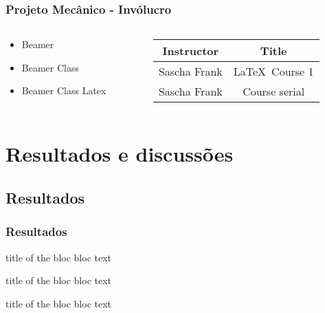 \documentclass[hyperref={pdfpagelabels=false}]{beamer}
\begin{document}
                \begin{frame}\frametitle{Projeto Mecânico - Invólucro}
                    \begin{columns}

                        \begin{column}{5cm}
                            \begin{itemize}
                                \item Beamer
                                \item Beamer Class
                                \item Beamer Class Latex
                            \end{itemize}
                        \end{column}

                        \begin{column}{5cm}
                            \begin{tabular}{|c|c|}
                                \hline
                                \textbf{Instructor} & \textbf{Title} \\
                                \hline
                                Sascha Frank &  \LaTeX \ Course 1 \\
                                \hline
                                Sascha Frank &  Course serial  \\
                                \hline
                            \end{tabular}
                        \end{column}
                    \end{columns}
                \end{frame}

        \section{Resultados e discussões}

            \subsection{Resultados}

                \begin{frame}\frametitle{Resultados}
                    \begin{block}{title of the bloc}
                        bloc text
                    \end{block}

                    \begin{exampleblock}{title of the bloc}
                        bloc text
                    \end{exampleblock}

                    \begin{alertblock}{title of the bloc}
                        bloc text
                    \end{alertblock}
                \end{frame}
\end{document}
